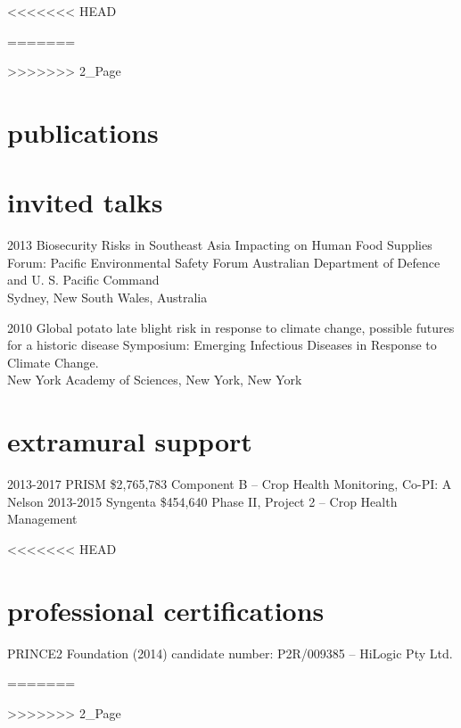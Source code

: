 \documentclass[]{friggeri-cv}
\begin{document}
<<<<<<< HEAD


=======

>>>>>>> 2_Page

\section{publications}

\begin{refsection}
  \nocite{*}
  \printbibliography[sorting=chronological, type=inreview, title={in review}, heading=subbibliography]
\end{refsection}
\begin{refsection}
  \nocite{*}
  \printbibliography[sorting=chronological, type=inproceedings, title={conferences/proceedings},  heading=subbibliography]
\end{refsection}
\begin{refsection}
  \nocite{*}
  \printbibliography[sorting=chronological, type=inbook, title={book chapters}, heading=subbibliography]
\end{refsection}
\begin{refsection}
  \nocite{*}
  \printbibliography[sorting=chronological, type=report, title={reports}, heading=subbibliography]
\end{refsection}

\section{invited talks}
\begin{entrylist}
\entry
{2013}
{Biosecurity Risks in Southeast Asia Impacting on Human Food Supplies}
{}
{Forum: Pacific Environmental Safety Forum Australian Department of Defence and U. S. Pacific Command\\Sydney, New South Wales, Australia}

\entry
{2010} 
{Global potato late blight risk in response to climate change, possible futures for a historic disease}
{}
{Symposium: Emerging Infectious Diseases in Response to Climate Change.\\New York Academy of Sciences, New York, New York}
\end{entrylist}

\section{extramural support}
  \begin{entrylist}
  \entry
	{2013-2017}
	{PRISM }
	{\$2,765,783}
	{Component B -- Crop Health Monitoring, Co-PI: A Nelson}
  \entry
	{2013-2015}
	{Syngenta}
	{\$454,640}
	{Phase II, Project 2 -- Crop Health Management}
  \end{entrylist}

<<<<<<< HEAD

\section{professional certifications}
PRINCE2 Foundation (2014) candidate number: P2R/009385 – HiLogic  Pty Ltd.


=======

>>>>>>> 2_Page
\end{document}
